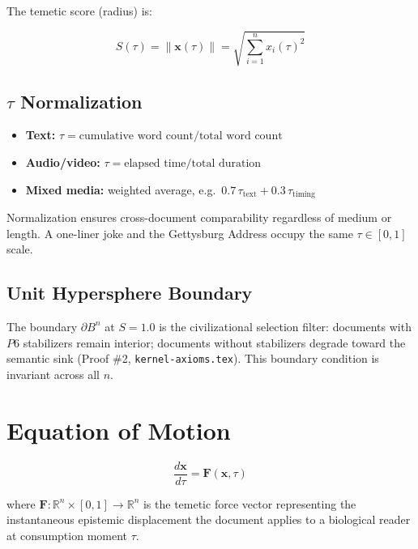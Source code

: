 \documentclass{article}
\begin{document}
The temetic score (radius) is:

\begin{equation}
S(\tau) = \|\mathbf{x}(\tau)\| = \sqrt{\sum_{i=1}^{n} x_i(\tau)^2}
\end{equation}

\subsection*{$\tau$ Normalization}

\begin{itemize}
  \item \textbf{Text:} $\tau = \text{cumulative word count} /
    \text{total word count}$
  \item \textbf{Audio/video:} $\tau = \text{elapsed time} /
    \text{total duration}$
  \item \textbf{Mixed media:} weighted average, e.g.\
    $0.7\,\tau_{\text{text}} + 0.3\,\tau_{\text{timing}}$
\end{itemize}

Normalization ensures cross-document comparability regardless of
medium or length. A one-liner joke and the Gettysburg Address
occupy the same $\tau \in [0,1]$ scale.

\subsection*{Unit Hypersphere Boundary}

The boundary $\partial B^n$ at $S = 1.0$ is the civilizational
selection filter: documents with $P6$ stabilizers remain interior;
documents without stabilizers degrade toward the semantic sink
(Proof \#2, \texttt{kernel-axioms.tex}). This boundary condition
is invariant across all $n$.

\section{Equation of Motion}

\begin{equation}
\frac{d\mathbf{x}}{d\tau} = \mathbf{F}(\mathbf{x}, \tau)
\end{equation}

where $\mathbf{F}: \mathbb{R}^n \times [0,1] \to \mathbb{R}^n$ is the
temetic force vector representing the instantaneous epistemic displacement
the document applies to a biological reader at consumption moment $\tau$.
\end{document}
